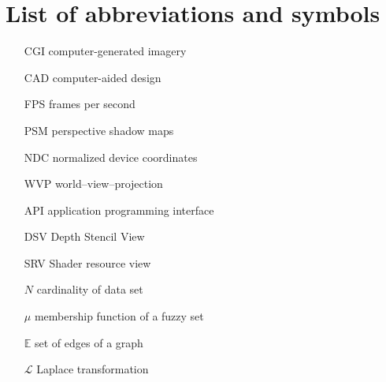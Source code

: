 \chapter{List of abbreviations and symbols}

\begin{itemize}
\item[CGI] computer-generated imagery
\item[CAD] computer-aided design
\item[FPS] frames per second
\item[PSM] perspective shadow maps

\item[NDC] normalized device coordinates
\item[WVP] world--view--projection
\item[API] application programming interface
\item[DSV] Depth Stencil View
\item[SRV] Shader resource view

\item[$N$] cardinality of data set
\item[$\mu$] membership function of a fuzzy set
\item[$\mathbb{E}$] set of edges of a graph
\item[$\mathcal{L}$] Laplace transformation
\end{itemize}